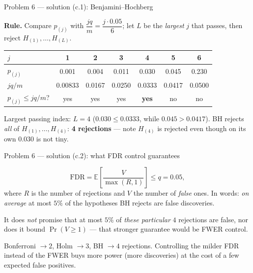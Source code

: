 \documentclass[aspectratio=169,11pt]{beamer}
\begin{document}
\begin{frame}{Problem 6 --- solution (c.1): Benjamini--Hochberg}
  \begin{solutionbox}
    \textbf{Rule.} Compare $p_{(j)}$ with $\dfrac{jq}{m}=\dfrac{j\cdot0.05}{6}$; let $L$ be the
    \emph{largest} $j$ that passes, then reject $H_{(1)},\dots,H_{(L)}$.
    \begin{center}\scriptsize
    \begin{tabular}{lcccccc}
      \toprule
      $j$ & 1 & 2 & 3 & 4 & 5 & 6\\
      \midrule
      $p_{(j)}$ & 0.001 & 0.004 & 0.011 & 0.030 & 0.045 & 0.230\\
      $jq/m$ & 0.00833 & 0.0167 & 0.0250 & 0.0333 & 0.0417 & 0.0500\\
      $p_{(j)}\le jq/m$? & yes & yes & yes & \textbf{yes} & no & no\\
      \bottomrule
    \end{tabular}
    \end{center}
    Largest passing index: $L=4$ ($0.030\le0.0333$, while $0.045>0.0417$). BH rejects \emph{all}
    of $H_{(1)},\dots,H_{(4)}$: \textbf{4 rejections} --- note $H_{(4)}$ is rejected even though on
    its own $0.030$ is not tiny.
  \end{solutionbox}
\end{frame}

\begin{frame}{Problem 6 --- solution (c.2): what FDR control guarantees}
  \begin{solutionbox}
    \[
      \text{FDR}=\mathbb{E}\!\left[\frac{V}{\max(R,1)}\right]\le q=0.05,
    \]
    where $R$ is the number of rejections and $V$ the number of \emph{false} ones. In words:
    \emph{on average} at most $5\%$ of the hypotheses BH rejects are false discoveries.
    \medskip

    It does \emph{not} promise that at most $5\%$ of \emph{these particular} $4$ rejections are
    false, nor does it bound $\Pr(V\ge1)$ --- that stronger guarantee would be FWER control.
  \end{solutionbox}
  \begin{takeaway}
    \footnotesize Bonferroni $\to2$, Holm $\to3$, BH $\to4$ rejections. Controlling the milder FDR
    instead of the FWER buys more power (more discoveries) at the cost of a few expected false
    positives.
  \end{takeaway}
\end{frame}
\end{document}
